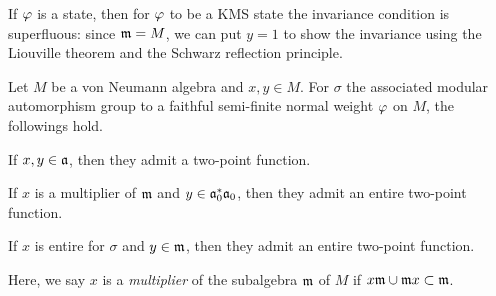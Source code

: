 \documentclass{../../../small}
\begin{document}
\begin{rmk*}
If $\varphi$ is a state, then for $\varphi$ to be a KMS state the invariance condition is superfluous: since $\mathfrak{m}=M$, we can put $y=1$ to show the invariance using the Liouville theorem and the Schwarz reflection principle.
\end{rmk*}


\begin{lem}
Let $M$ be a von Neumann algebra and $x,y\in M$.
For $\sigma$ the associated modular automorphism group to a faithful semi-finite normal weight $\varphi$ on $M$, the followings hold.
\begin{parts}
\item If $x,y\in\mathfrak{a}$, then they admit a two-point function.
\item If $x$ is a multiplier of $\mathfrak{m}$ and $y\in\mathfrak{a}_0^*\mathfrak{a}_0$, then they admit an entire two-point function.
\item If $x$ is entire for $\sigma$ and $y\in\mathfrak{m}$, then they admit an entire two-point function.
\end{parts}
Here, we say $x$ is a \emph{multiplier} of the subalgebra $\mathfrak{m}$ of $M$ if $x\mathfrak{m}\cup\mathfrak{m} x\subset\mathfrak{m}$.
\end{lem}
\end{document}
